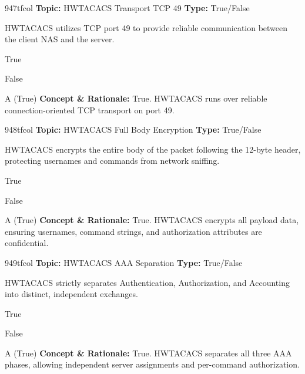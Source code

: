 \begin{qcard}{947}{tfcol}
\textcolor{darkslate!75}{\small\textbf{Topic:} HWTACACS Transport TCP 49 \hfill \textbf{Type:} True/False}\vspace{0.4em}\par
HWTACACS utilizes TCP port 49 to provide reliable communication between the client NAS and the server.
\begin{qoptions}
\item True
\item False
\end{qoptions}
\end{qcard}
\nopagebreak
\begin{explainbox}{A (True)}
\textbf{Concept \& Rationale:} True. HWTACACS runs over reliable connection-oriented TCP transport on port 49.
\end{explainbox}

\begin{qcard}{948}{tfcol}
\textcolor{darkslate!75}{\small\textbf{Topic:} HWTACACS Full Body Encryption \hfill \textbf{Type:} True/False}\vspace{0.4em}\par
HWTACACS encrypts the entire body of the packet following the 12-byte header, protecting usernames and commands from network sniffing.
\begin{qoptions}
\item True
\item False
\end{qoptions}
\end{qcard}
\nopagebreak
\begin{explainbox}{A (True)}
\textbf{Concept \& Rationale:} True. HWTACACS encrypts all payload data, ensuring usernames, command strings, and authorization attributes are confidential.
\end{explainbox}

\begin{qcard}{949}{tfcol}
\textcolor{darkslate!75}{\small\textbf{Topic:} HWTACACS AAA Separation \hfill \textbf{Type:} True/False}\vspace{0.4em}\par
HWTACACS strictly separates Authentication, Authorization, and Accounting into distinct, independent exchanges.
\begin{qoptions}
\item True
\item False
\end{qoptions}
\end{qcard}
\nopagebreak
\begin{explainbox}{A (True)}
\textbf{Concept \& Rationale:} True. HWTACACS separates all three AAA phases, allowing independent server assignments and per-command authorization.
\end{explainbox}

